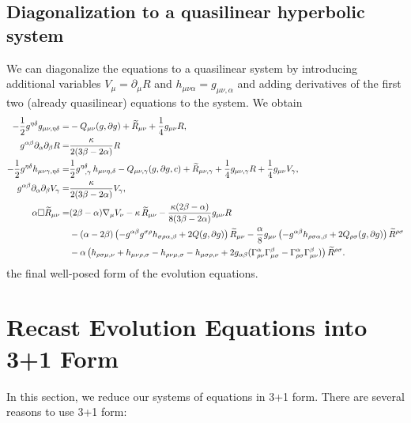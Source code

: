 \documentclass[a4paper,oneside,openany,11pt]{memoir}
\numberwithin{equation}{section} %
\begin{document}
\subsection{Diagonalization to a quasilinear hyperbolic system}
We can diagonalize the equations to a quasilinear system by introducing additional variables $V_\mu = \partial_\mu R$ and $h_{\mu\nu\alpha} = g_{\mu\nu,\alpha}$ and adding derivatives of the first two (already quasilinear) equations to the system. We obtain
\begin{align}
\label{eq:MoralesForm}
	-\frac{1}{2}g^{\eta\delta}g_{\mu\nu,\eta\delta}=
	&-Q_{\mu\nu}(g,\partial g)+\widetilde{R}_{\mu\nu} + \frac{1}{4}g_{\mu\nu}R,
	\\
	g^{\alpha\beta}\partial_{\alpha}\partial_{\beta}R=
	&\frac{\kappa}{2(3\beta-2\alpha)}R
	\\
	-\frac{1}{2}g^{\eta\delta}h_{\mu\nu\gamma,\eta\delta}=
	&\frac{1}{2}g^{\eta\delta}_{\,\,\,\,,\gamma}\,h_{\mu\nu\eta,\delta}-Q_{\mu\nu,\gamma}(g,\partial g, c)+\widetilde{R}_{\mu\nu,\gamma}
	+\frac{1}{4}g_{\mu\nu,\gamma}R+\frac{1}{4}g_{\mu\nu}V_\gamma,
	\\
	g^{\alpha\beta}\partial_{\alpha}\partial_{\beta}V_\gamma=
	&\frac{\kappa}{2(3\beta-2\alpha)}V_\gamma,
	\\
	\alpha \square \widetilde R_{\mu\nu}=
	&(2\beta-\alpha) \nabla_{\mu}V_\nu
	-\kappa\,\widetilde{R}_{\mu\nu}
	-\frac{\kappa(2\beta-\alpha)}{8(3\beta-2\alpha)}g_{\mu\nu}R 
	\\\notag
	&-(\alpha-2\beta)\left(-g^{\alpha\beta}g^{\sigma\rho}h_{\sigma\rho\alpha,\beta}+2Q(g,\partial g)\right)\widetilde{R}_{\mu\nu}
	-\frac{\alpha}{8} g_{\mu\nu}\left(-g^{\alpha\beta}h_{\rho\sigma\alpha,\beta}+2Q_{\rho\sigma}(g,\partial g)\right)\widetilde{R}^{\rho\sigma}
	\\\notag
	&-\alpha \left(h_{\rho\sigma\mu,\nu} +h_{\mu\nu\rho,\sigma}-h_{\rho\nu\mu,\sigma} -h_{\mu\sigma\rho,\nu}+2g_{\alpha\beta}(\Gamma^{\alpha}_{\rho\nu}\Gamma^{\beta}_{\mu\sigma}-\Gamma_{\rho\sigma}^{\alpha}\Gamma_{\mu\nu}^{\beta})\right)\widetilde{R}^{\rho\sigma}.
\end{align}
the final well-posed form of the evolution equations.

\section{Recast Evolution Equations into 3+1 Form}

In this section, we reduce our systems of equations in 3+1 form. There are several reasons to use 3+1 form:
\end{document}
